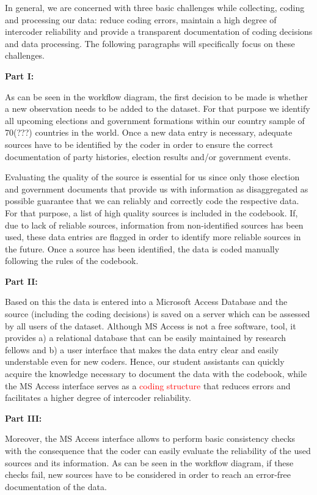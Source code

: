 \documentclass[
  11pt
]{article}
\begin{document}
In general, we are concerned with three basic challenges while collecting, coding and processing our data: reduce coding errors, maintain a high degree of intercoder reliability and provide a transparent documentation of coding decisions and data processing. The following paragraphs will specifically focus on these challenges.

\textbf{Part I:}

As can be seen in the workflow diagram, the first decision to be made is whether a new observation needs to be added to the dataset. For that purpose we identify all upcoming elections and government formations within our country sample of 70(???) countries in the world. Once a new data entry is necessary, adequate sources have to be identified by the coder in order to ensure the correct documentation of party histories, election results and/or government events.

Evaluating the quality of the source is essential for us since only those election and government documents that provide us with information as disaggregated as possible guarantee that we can reliably and correctly code the respective data. For that purpose, a list of high quality sources is included in the codebook. If, due to lack of reliable sources, information from non-identified sources has been used, these data entries are flagged in order to identify more reliable sources in the future. Once a source has been identified, the data is coded manually following the rules of the codebook.

\textbf{Part II:}

Based on this the data is entered into a Microsoft Access Database and the source (including the coding decisions) is saved on a server which can be assessed by all users of the dataset. Although MS Access is not a free software, tool, it provides a) a relational database that can be easily maintained by research fellows and b) a user interface that makes the data entry clear and easily understable even for new coders. Hence, our student assistants can quickly acquire the knowledge necessary to document the data with the codebook, while the MS Access interface serves as a \textcolor{red}{coding structure} that reduces errors and facilitates a higher degree of intercoder reliability.

\textbf{Part III:}

Moreover, the MS Access interface allows to perform basic consistency checks with the consequence that the coder can easily evaluate the reliability of the used sources and its information. As can be seen in the workflow diagram, if these checks fail, new sources have to be considered in order to reach an error-free documentation of the data.
\end{document}
